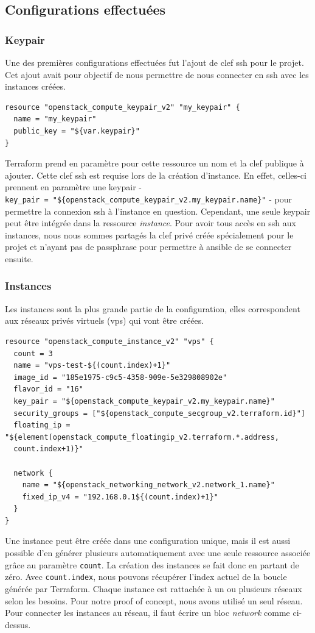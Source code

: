 \documentclass[]{article}
\begin{document}
\subsection{Configurations
effectuées}\label{configurations-effectuuxe9es}

\subsubsection{Keypair}\label{keypair}

Une des premières configurations effectuées fut l'ajout de clef ssh pour
le projet. Cet ajout avait pour objectif de nous permettre de nous
connecter en ssh avec les instances créées.
\begin{verbatim}
resource "openstack_compute_keypair_v2" "my_keypair" {
  name = "my_keypair"
  public_key = "${var.keypair}"
}
\end{verbatim}
Terraform prend en paramètre pour cette ressource un nom et la clef
publique à ajouter. Cette clef ssh est requise lors de la création
d'instance. En effet, celles-ci prennent en paramètre une keypair -
\texttt{key\_pair\ =\ "\$\{openstack\_compute\_keypair\_v2.my\_keypair.name\}"}
- pour permettre la connexion ssh à l'instance en question. Cependant,
une seule keypair peut être intégrée dans la ressource \emph{instance}.
Pour avoir tous accès en ssh aux instances, nous nous sommes partagés la
clef privé créée spécialement pour le projet et n'ayant pas de
passphrase pour permettre à ansible de se connecter ensuite.

\subsubsection{Instances}\label{instances}

Les instances sont la plus grande partie de la configuration, elles
correspondent aux réseaux privés virtuels (vps) qui vont être créées.
\begin{verbatim}
resource "openstack_compute_instance_v2" "vps" {
  count = 3
  name = "vps-test-${(count.index)+1}"
  image_id = "185e1975-c9c5-4358-909e-5e329808902e"
  flavor_id = "16"
  key_pair = "${openstack_compute_keypair_v2.my_keypair.name}"
  security_groups = ["${openstack_compute_secgroup_v2.terraform.id}"]
  floating_ip = "${element(openstack_compute_floatingip_v2.terraform.*.address,
  count.index+1)}"

  network {
    name = "${openstack_networking_network_v2.network_1.name}"
    fixed_ip_v4 = "192.168.0.1${(count.index)+1}"
  }
}
\end{verbatim}
Une instance peut être créée dans une configuration unique, mais il est aussi possible d'en générer plusieurs automatiquement avec une seule ressource associée grâce au paramètre \texttt{count}.
La création des instances se fait donc en partant de zéro. Avec \texttt{count.index}, nous pouvons récupérer l'index actuel de la boucle générée par Terraform. Chaque instance est rattachée à un ou plusieurs réseaux selon les besoins. Pour notre proof of concept, nous avons utilisé un seul réseau. Pour connecter les instances au réseau, il faut écrire un bloc \textit{network} comme ci-dessus.
\end{document}
